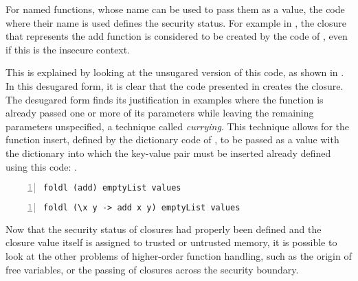 \label{sec:OnlyLambdaClosures}
For named functions, whose name can be used to pass them as a value, the code where their name is used defines the security status.
For example in , the closure that represents the add function is considered to be created by the code of , even if this is the insecure context.

This is explained by looking at the unsugared version of this code, as shown in .
In this desugared form, it is clear that the code presented in  creates the closure.
The desugared form finds its justification in examples where the function is already passed one or more of its parameters while leaving the remaining parameters unspecified, a technique called \emph{currying}.
This technique allows for the function insert, defined by the dictionary code of , to be passed as a value with the dictionary into which the key-value pair must be inserted already defined using this code: .

\begin{lstlisting}[frame=single, language=ML,caption={[Predefined Function Passing]Passing a predefined function.}, label=code:implicit,numbers=left]
foldl (add) emptyList values
\end{lstlisting}

\begin{lstlisting}[frame=single, language=ML,caption={[Predefined Function Passing: Unsugared]Passing a predefined function, unsugared.}, label=code:explicit,numbers=left]
foldl (\x y -> add x y) emptyList values
\end{lstlisting}

Now that the security status of closures had properly been defined and the closure value itself is assigned to trusted or untrusted memory, it is possible to look at the other problems of higher-order function handling, such as the origin of free variables, or the passing of closures across the security boundary.





